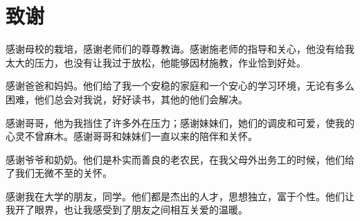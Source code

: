 \section*{致谢}

感谢母校的栽培，感谢老师们的尊尊教诲。感谢施老师的指导和关心，他没有给我太大的压力，也没有让我过于放松，他能够因材施教，作业恰到好处。   

感谢爸爸和妈妈。他们给了我一个安稳的家庭和一个安心的学习环境，无论有多么困难，他们总会对我说，好好读书，其他的他们会解决。

感谢哥哥，他为我挡住了许多外在压力；感谢妹妹们，她们的调皮和可爱，使我的心灵不曾麻木。感谢哥哥和妹妹们一直以来的陪伴和关怀。

感谢爷爷和奶奶。他们是朴实而善良的老农民，在我父母外出务工的时候，他们给了我们无微不至的关怀。

感谢我在大学的朋友，同学。他们都是杰出的人才，思想独立，富于个性。他们让我开了眼界，也让我感受到了朋友之间相互关爱的温暖。